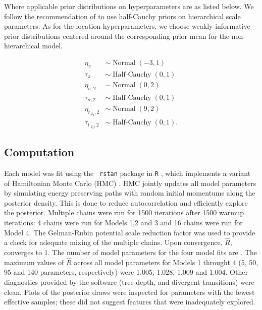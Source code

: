 \documentclass[12pt]{article}
\newcommand{\op}{\operatorname}
\begin{document}
Where applicable prior distributions on hyperparameters are as listed below. We follow the recommendation of \citet{gelman2014bayesian} to use half-Cauchy priors on hierarchical scale parameters. As for the location hyperparameters, we choose weakly informative prior distributions centered around the corresponding prior mean for the non-hierarchical model.

\begin{align*}
  \eta_{\pi} & \sim \op{Normal}(-3, 1)\\
  \tau_{\pi} & \sim \op{Half-Cauchy}(0, 1)\\
  \eta_{\sigma ,2} & \sim \op{Normal}(0, 2)\\
  \tau_{\sigma ,2} & \sim \op{Half-Cauchy}(0, 1)\\
  \eta_{t_{.2_2},2} & \sim \op{Normal}(9, 2)\\
  \tau_{t_{.2_2},2} & \sim \op{Half-Cauchy}(0, 1).
 \end{align*} 

\subsection{Computation}
\label{sec:Computation}
Each model was fit using the {\tt
  rstan}\cite{rstan} package in {\tt R} \cite{r}, which implements a variant of Hamiltonian Monte Carlo (HMC)
\cite{betancourt}. HMC jointly updates all model parameters by simulating energy preserving paths with random initial momentums along the posterior density. This is done to reduce autocorrelation and efficiently explore the posterior. Multiple chains were run for 1500 iterations after 1500 warmup iterations: 4 chains were run for Models 1,2 and 3 and 16 chains were run for Model 4. The Gelman-Rubin potential scale reduction factor was used to provide a check for adequate mixing of the multiple chains. Upon convergence, $\hat{R}$, converges to 1. The number of model parameters for the four model fits are . The  maximum values of $\hat{R}$ across all model parameters for Models 1 throught 4 (5, 50, 95 and 140 parameters, respectively) were 1.005, 1.028, 1.009 and 1.004. Other diagnostics provided by the software (tree-depth, and divergent transitions) were clean. Plots of the posterior draws were inspected for parameters with the fewest effective samples; these did not suggest features that were inadequately explored.
\end{document}
